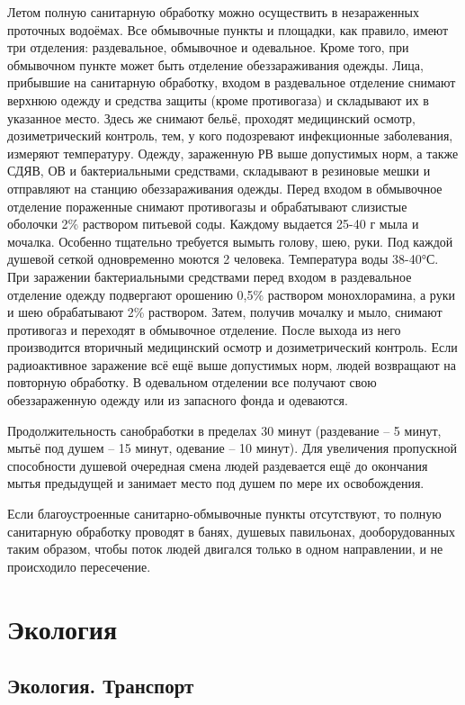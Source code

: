 \documentclass[a4paper, 12pt]{article}
\theoremstyle{definition}
\begin{document}
        Летом полную санитарную обработку можно осуществить в незараженных проточных водоёмах. Все обмывочные пункты и площадки, как правило, имеют три отделения: раздевальное, обмывочное и одевальное. Кроме того, при обмывочном пункте может быть отделение обеззараживания одежды. Лица, прибывшие на санитарную обработку, входом в раздевальное отделение снимают верхнюю одежду и средства защиты (кроме противогаза) и складывают их в указанное место. Здесь же снимают бельё, проходят медицинский осмотр, дозиметрический контроль, тем, у кого подозревают инфекционные заболевания, измеряют температуру. Одежду, зараженную РВ выше допустимых норм, а также СДЯВ, ОВ и бактериальными средствами, складывают в резиновые мешки и отправляют на станцию обеззараживания одежды. Перед входом в обмывочное отделение пораженные снимают противогазы и обрабатывают слизистые оболочки 2\% раствором питьевой соды. Каждому выдается 25-40 г мыла и мочалка. Особенно тщательно требуется вымыть голову, шею, руки. Под каждой душевой сеткой одновременно моются 2 человека. Температура воды 38-40°С. При заражении бактериальными средствами перед входом в раздевальное отделение одежду подвергают орошению 0,5\% раствором монохлорамина, а руки и шею обрабатывают 2\% раствором. Затем, получив мочалку и мыло, снимают противогаз и переходят в обмывочное отделение. После выхода из него производится вторичный медицинский осмотр и дозиметрический контроль. Если радиоактивное заражение всё ещё выше допустимых норм, людей возвращают на повторную обработку. В одевальном отделении все получают свою обеззараженную одежду или из запасного фонда и одеваются. 

        Продолжительность санобработки в пределах 30 минут (раздевание – 5 минут, мытьё под душем – 15 минут, одевание – 10 минут). Для увеличения пропускной способности душевой очередная смена людей раздевается ещё до окончания мытья предыдущей и занимает место под душем по мере их освобождения.
        
        Если благоустроенные санитарно-обмывочные пункты отсутствуют, то полную санитарную обработку проводят в банях, душевых павильонах, дооборудованных таким образом, чтобы поток людей двигался только в одном направлении, и не происходило пересечение.

        \section{Экология}
        \subsection{Экология. Транспорт}
\end{document}
